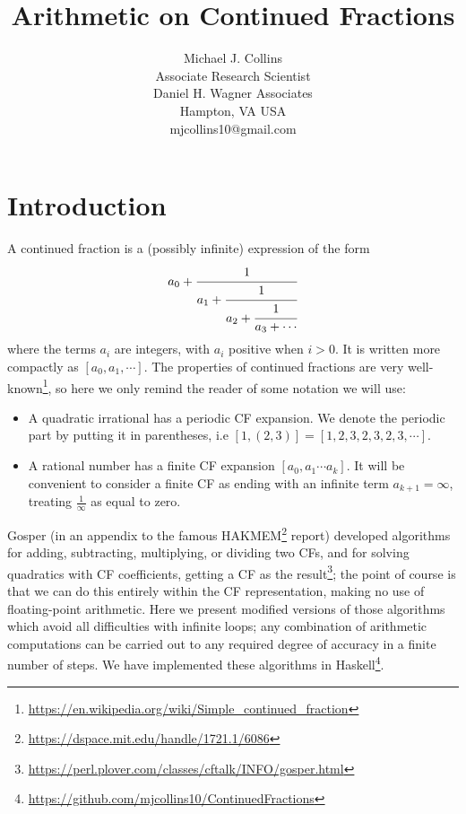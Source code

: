 \documentclass[11pt, oneside]{amsart}   	%
\title{Arithmetic on Continued Fractions}
\author{Michael J. Collins\\Associate Research Scientist\\Daniel H. Wagner Associates\\Hampton, VA USA\\mjcollins10@gmail.com}
\begin{document}
\maketitle

\section{Introduction}
A continued fraction is a (possibly infinite) expression of the form
\begin{equation*}
a_0+\cfrac{1}{a_1+\cfrac{1}{a_2+\cfrac{1}{a_3+\cdots}}}
\end{equation*}
where the terms $a_i$ are integers, with $a_i$ positive when $i>0$. It is written more compactly as $[a_0, a_1, \cdots]$. The properties of continued fractions are very well-known\footnote{\href{https://en.wikipedia.org/wiki/Simple\_continued\_fraction}{https://en.wikipedia.org/wiki/Simple\_continued\_fraction}}, so here we only remind the reader of some notation we will use:
\begin{itemize}
\item A quadratic irrational has a periodic CF expansion. We denote the periodic part by putting it in parentheses, i.e $[1,(2,3)] = [1,2,3,2,3,2,3,\cdots]$.
\item A rational number has a finite CF expansion $[a_0,a_1\cdots a_k]$. It will be convenient to consider a finite CF as ending with an infinite term $a_{k+1}=\infty$, treating $\frac{1}{\infty}$ as equal to zero.
\end{itemize}
 
Gosper (in an appendix to the famous HAKMEM\footnote{\href{https://dspace.mit.edu/handle/1721.1/6086}{https://dspace.mit.edu/handle/1721.1/6086}} report)  developed algorithms for adding, subtracting, multiplying, or dividing two CFs, and for solving quadratics with CF coefficients, getting a CF as the result\footnote{\href{https://perl.plover.com/classes/cftalk/INFO/gosper.html}{https://perl.plover.com/classes/cftalk/INFO/gosper.html}}; the point of course is that we can do this entirely within the CF representation, making no use of floating-point arithmetic. Here we present modified versions of those algorithms which avoid all difficulties with infinite loops; any combination of arithmetic computations can be carried out to any required degree of accuracy in a finite number of steps. We have implemented these algorithms in Haskell\footnote{\href{https://github.com/mjcollins10/ContinuedFractions}{https://github.com/mjcollins10/ContinuedFractions}}.
\end{document}
